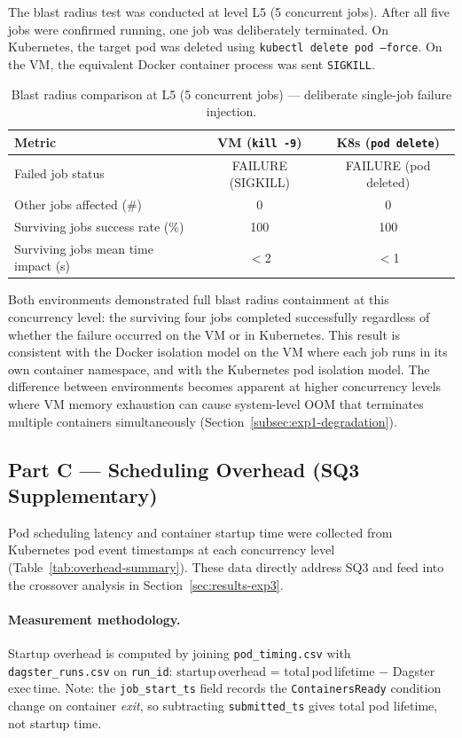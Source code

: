 The blast radius test was conducted at level L5 (5 concurrent jobs).
After all five jobs were confirmed running, one job was deliberately terminated.
On Kubernetes, the target pod was deleted using \texttt{kubectl delete pod --force}.
On the VM, the equivalent Docker container process was sent \texttt{SIGKILL}.

\begin{table}[H]
  \centering
  \caption{Blast radius comparison at L5 (5 concurrent jobs) --- deliberate single-job failure injection.}
  \label{tab:blast-radius}
  \small
  \begin{tabular}{lcc}
    \toprule
    \textbf{Metric} & \textbf{VM (\texttt{kill -9})} & \textbf{K8s (\texttt{pod delete})} \\
    \midrule
    Failed job status & FAILURE (SIGKILL) & FAILURE (pod deleted) \\
    Other jobs affected (\#) & 0 & 0 \\
    Surviving jobs success rate (\%) & 100 & 100 \\
    Surviving jobs mean time impact (s) & $<$2 & $<$1 \\
    \bottomrule
  \end{tabular}
\end{table}

Both environments demonstrated full blast radius containment at this concurrency level:
the surviving four jobs completed successfully regardless of whether the failure occurred on the VM or in Kubernetes.
This result is consistent with the Docker isolation model on the VM where each job runs in its own container namespace, and with the Kubernetes pod isolation model.
The difference between environments becomes apparent at higher concurrency levels where VM memory exhaustion can cause system-level OOM that terminates multiple containers simultaneously (Section~\ref{subsec:exp1-degradation}).

\subsection{Part C --- Scheduling Overhead (SQ3 Supplementary)}
\label{subsec:results-exp2c}

Pod scheduling latency and container startup time were collected from Kubernetes pod event timestamps at each concurrency level (Table~\ref{tab:overhead-summary}).
These data directly address SQ3 and feed into the crossover analysis in Section~\ref{sec:results-exp3}.

\paragraph{Measurement methodology.}
Startup overhead is computed by joining \texttt{pod\_timing.csv} with \texttt{dagster\_runs.csv} on \texttt{run\_id}: startup\,overhead = total\,pod\,lifetime $-$ Dagster\,exec\,time.
Note: the \texttt{job\_start\_ts} field records the \texttt{ContainersReady} condition change on container \emph{exit}, so subtracting \texttt{submitted\_ts} gives total pod lifetime, not startup time.

